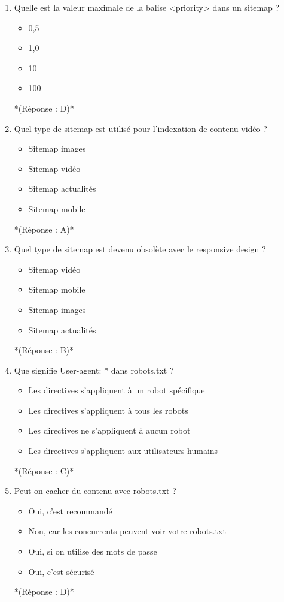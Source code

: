 \documentclass[12pt,a4paper,twoside]{report}
\begin{document}
\begin{enumerate}
\item Quelle est la valeur maximale de la balise <priority> dans un sitemap ?
\begin{itemize}
\item[A)] 0,5
\item[B)] 1,0
\item[C)] 10
\item[D)] 100
\end{itemize}
*(Réponse : D)*

\item Quel type de sitemap est utilisé pour l'indexation de contenu vidéo ?
\begin{itemize}
\item[A)] Sitemap images
\item[B)] Sitemap vidéo
\item[C)] Sitemap actualités
\item[D)] Sitemap mobile
\end{itemize}
*(Réponse : A)*

\item Quel type de sitemap est devenu obsolète avec le responsive design ?
\begin{itemize}
\item[A)] Sitemap vidéo
\item[B)] Sitemap mobile
\item[C)] Sitemap images
\item[D)] Sitemap actualités
\end{itemize}
*(Réponse : B)*

\item Que signifie User-agent: * dans robots.txt ?
\begin{itemize}
\item[A)] Les directives s'appliquent à un robot spécifique
\item[B)] Les directives s'appliquent à tous les robots
\item[C)] Les directives ne s'appliquent à aucun robot
\item[D)] Les directives s'appliquent aux utilisateurs humains
\end{itemize}
*(Réponse : C)*

\item Peut-on cacher du contenu avec robots.txt ?
\begin{itemize}
\item[A)] Oui, c'est recommandé
\item[B)] Non, car les concurrents peuvent voir votre robots.txt
\item[C)] Oui, si on utilise des mots de passe
\item[D)] Oui, c'est sécurisé
\end{itemize}
*(Réponse : D)*


\end{enumerate}
\end{document}
